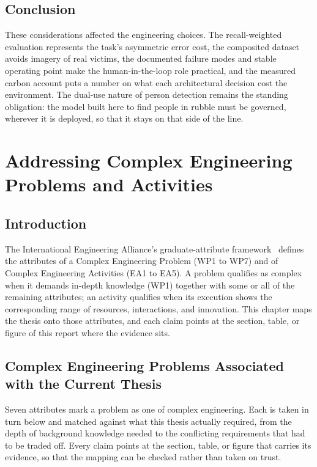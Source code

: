 \documentclass[12pt,a4paper,oneside]{report}
\begin{document}
\section{Conclusion}
These considerations affected the engineering choices. The recall-weighted
evaluation represents the task's asymmetric error cost, the
composited dataset avoids imagery of real victims, the documented failure
modes and stable operating point make the human-in-the-loop role practical,
and the measured carbon account puts a number on what each architectural
decision cost the environment. The dual-use nature of person detection
remains the standing obligation: the model built here to find people in
rubble must be governed, wherever it is deployed, so that it stays on that
side of the line.
 \newpage 
 \newpage \chapter{Addressing Complex Engineering Problems and Activities}

\section{Introduction}
The International Engineering Alliance's graduate-attribute
framework~\cite{iea2021gapc} defines the
attributes of a Complex Engineering Problem (WP1 to WP7) and of Complex
Engineering Activities (EA1 to EA5). A problem qualifies as complex when it
demands in-depth knowledge (WP1) together with some or all of the remaining
attributes; an activity qualifies when its execution shows the corresponding
range of resources, interactions, and innovation. This chapter maps the
thesis onto those attributes, and each claim points at the section, table,
or figure of this report where the evidence sits.

\section{Complex Engineering Problems Associated with the Current Thesis}

Seven attributes mark a problem as one of complex engineering. Each is taken in
turn below and matched against what this thesis actually required, from the depth
of background knowledge needed to the conflicting requirements that had to be
traded off. Every claim points at the section, table, or figure that carries its
evidence, so that the mapping can be checked rather than taken on trust.
\end{document}
